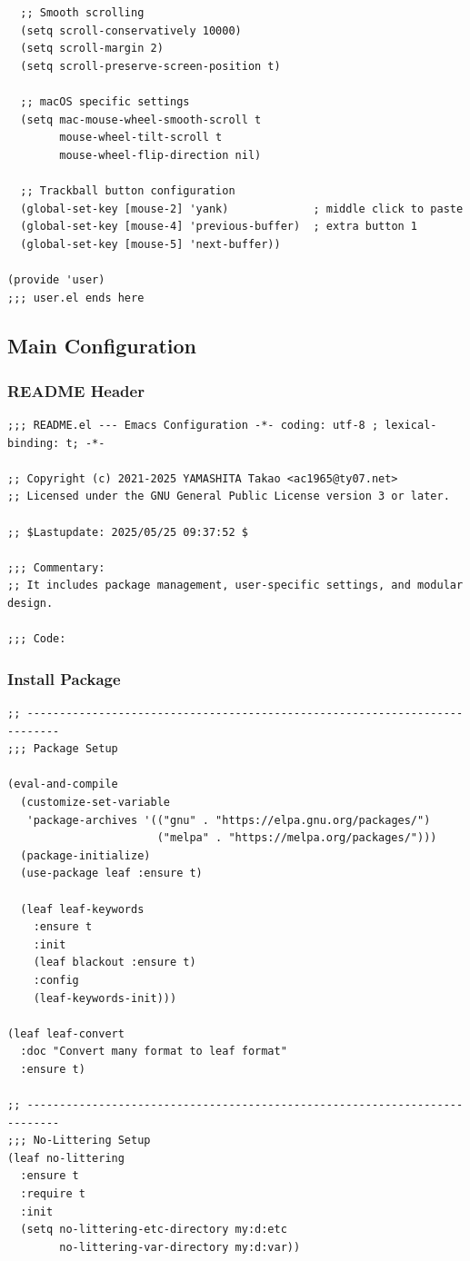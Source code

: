 \documentclass[11pt]{article}
\begin{document}
\begin{verbatim}
  ;; Smooth scrolling
  (setq scroll-conservatively 10000)
  (setq scroll-margin 2)
  (setq scroll-preserve-screen-position t)

  ;; macOS specific settings
  (setq mac-mouse-wheel-smooth-scroll t
        mouse-wheel-tilt-scroll t
        mouse-wheel-flip-direction nil)

  ;; Trackball button configuration
  (global-set-key [mouse-2] 'yank)             ; middle click to paste
  (global-set-key [mouse-4] 'previous-buffer)  ; extra button 1
  (global-set-key [mouse-5] 'next-buffer))

(provide 'user)
;;; user.el ends here
\end{verbatim}
\subsection{Main Configuration}
\label{sec:org82927fb}
\subsubsection{README Header}
\label{sec:orgdfc6c18}

\begin{verbatim}
;;; README.el --- Emacs Configuration -*- coding: utf-8 ; lexical-binding: t; -*-

;; Copyright (c) 2021-2025 YAMASHITA Takao <ac1965@ty07.net>
;; Licensed under the GNU General Public License version 3 or later.

;; $Lastupdate: 2025/05/25 09:37:52 $

;;; Commentary:
;; It includes package management, user-specific settings, and modular design.

;;; Code:
\end{verbatim}
\subsubsection{Install Package}
\label{sec:orgef9e237}

\begin{verbatim}
;; ---------------------------------------------------------------------------
;;; Package Setup

(eval-and-compile
  (customize-set-variable
   'package-archives '(("gnu" . "https://elpa.gnu.org/packages/")
                       ("melpa" . "https://melpa.org/packages/")))
  (package-initialize)
  (use-package leaf :ensure t)

  (leaf leaf-keywords
    :ensure t
    :init
    (leaf blackout :ensure t)
    :config
    (leaf-keywords-init)))

(leaf leaf-convert
  :doc "Convert many format to leaf format"
  :ensure t)

;; ---------------------------------------------------------------------------
;;; No-Littering Setup
(leaf no-littering
  :ensure t
  :require t
  :init
  (setq no-littering-etc-directory my:d:etc
        no-littering-var-directory my:d:var))
\end{verbatim}
\end{document}
